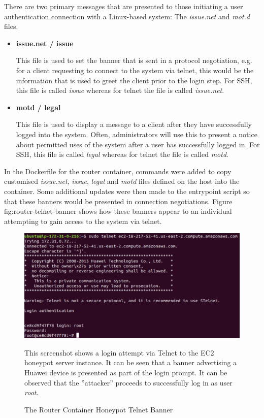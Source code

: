 There are two primary messages that are presented to those initiating a user authentication connection with a Linux-based system: The \textit{issue.net} and \textit{mot.d} files.
\begin{itemize}
\item \textbf{issue.net / issue}

        This file is used to set the banner that is sent in a protocol negotiation, e.g. for a client requesting to connect to the system via telnet, this would be the information that is used to greet the client prior to the login step. For SSH, this file is called \textit{issue} whereas for telnet the file is called \textit{issue.net}.

\item \textbf{motd / legal}

        This file is used to display a message to a client after they have successfully logged into the system. Often, administrators will use this to present a notice about permitted uses of the system after a user has successfully logged in. For SSH, this file is called \textit{legal} whereas for telnet the file is called \textit{motd}.
		\end{itemize}
        
In the Dockerfile for the router container, commands were added to copy customised \textit{issue.net}, \textit{issue}, \textit{legal} and \textit{motd} files defined on the host into the container. Some additional updates were then made to the entrypoint script so that these banners would be presented in connection negotiations. Figure {fig:router-telnet-banner} shows how these banners appear to an individual attempting to gain access to the system via telnet.

 \begin{figure}[ht]
      \centering
      \includegraphics[width=160mm, scale=1]{Images/logging_into_router_container_with_telnet.PNG}
      \caption{The Router Container Honeypot Telnet Banner} 
      \medskip
      \small
		This screenshot shows a login attempt via Telnet to the EC2 honeypot server instance. It can be seen that a banner advertising a Huawei device is presented as part of the login prompt. It can be observed that the ''attacker'' proceeds to successfully log in as user \textit{root}.
\label{fig:router-telnet-banner}
\end{figure}

